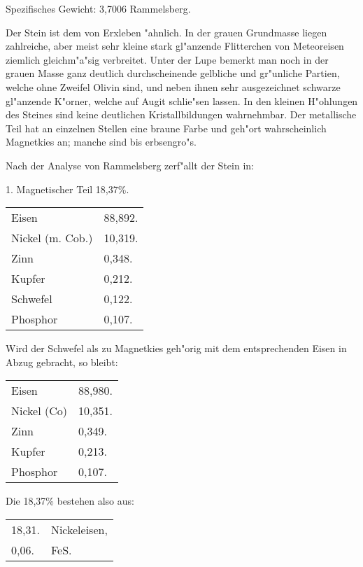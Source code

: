\documentclass[a4paper, 11pt, oneside]{article}
\begin{document}
Spezifisches Gewicht: 3,7006 Rammelsberg.

Der Stein ist dem von Erxleben "ahnlich. In der grauen Grundmasse liegen zahlreiche, aber meist sehr kleine stark gl"anzende Flitterchen von Meteoreisen ziemlich gleichm"a"sig verbreitet. Unter der Lupe bemerkt man noch in der grauen Masse ganz deutlich durchscheinende gelbliche und gr"unliche Partien, welche ohne Zweifel Olivin sind, und neben ihnen sehr ausgezeichnet schwarze gl"anzende K"orner, welche auf Augit schlie"sen lassen. In den kleinen H"ohlungen des Steines sind keine deutlichen Kristallbildungen wahrnehmbar. Der metallische Teil hat an einzelnen Stellen eine braune Farbe und geh"ort wahrscheinlich Magnetkies an; manche sind bis erbsengro"s.

Nach der Analyse von Rammelsberg zerf"allt der Stein in:
\begin{center}
1. Magnetischer Teil 18,37\%.
\end{center}
\begin{table}[H]
    \centering
    \begin{tabular}{l l}
        \hline
        Eisen & 88,892. \\
        Nickel (m. Cob.)  & 10,319. \\
        Zinn & 0,348. \\
        Kupfer & 0,212. \\
        Schwefel & 0,122. \\
        Phosphor & 0,107. \\
    \end{tabular}
\end{table}

Wird der Schwefel als zu Magnetkies geh"orig mit dem entsprechenden Eisen in Abzug gebracht, so bleibt:
\begin{table}[H]
    \centering
    \begin{tabular}{l l}
        Eisen & 88,980. \\
        Nickel (Co) & 10,351. \\
        Zinn & 0,349. \\
        Kupfer & 0,213. \\
        Phosphor & 0,107. \\
    \end{tabular}
\end{table}

Die 18,37\% bestehen also aus:
\begin{table}[H]
    \centering
    \begin{tabular}{l l}
        18,31. & Nickeleisen, \\
        0,06. & FeS. \\
    \end{tabular}
\end{table}
\end{document}
